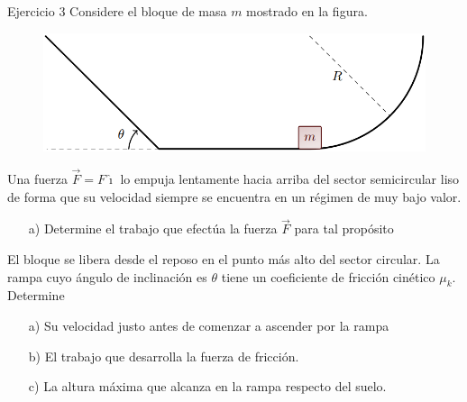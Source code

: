   \begin{frame}{Ejercicio 3}
      Considere el bloque de masa $m$ mostrado en la figura. 

    \begin{figure}
        \centering
        \includegraphics[width=0.5\linewidth]{figures/rampa-curva.png}
    \end{figure}

    Una fuerza $\vec{F}=F\hat{\imath}$ lo empuja lentamente hacia arriba del sector semicircular liso de forma que su velocidad siempre se encuentra en un régimen de muy bajo valor.
      
      \begin{itemize}
          \item[a)] Determine el trabajo que efectúa la fuerza $\vec{F}$ para tal propósito
      \end{itemize}
      El bloque se libera desde el reposo en el punto más alto del sector circular. La rampa cuyo ángulo de inclinación es $\theta$ tiene un coeficiente de fricción cinético $\mu_k$. Determine \begin{itemize}
          \item[a)] Su velocidad justo antes de comenzar a ascender por la rampa
          \item[b)] El trabajo que desarrolla la fuerza de fricción.
          \item[c)] La altura máxima que alcanza en la rampa respecto del suelo.
      \end{itemize}
  \end{frame} 